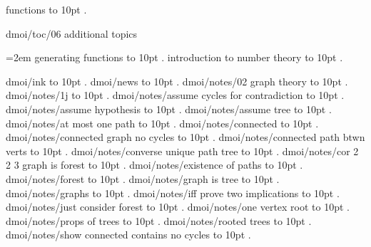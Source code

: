  functions \leaders\hbox to 10pt {\hss.\hss}  \hfill {}
\smallskip
\par\endgroup
\bigskip
{}
dmoi/toc/06 additional topics
\par\begingroup
\leftskip=2em
\smallskip
{} generating functions \leaders\hbox to 10pt {\hss.\hss}  \hfill {}
 introduction to number theory \leaders\hbox to 10pt {\hss.\hss}  \hfill {}
\smallskip
\par\endgroup
\bigskip
dmoi/ink \leaders\hbox to 10pt {\hss.\hss}  \hfill {}
\smallskip
dmoi/news \leaders\hbox to 10pt {\hss.\hss}  \hfill {}
\smallskip
dmoi/notes/02 graph theory \leaders\hbox to 10pt {\hss.\hss}  \hfill {}
\smallskip
dmoi/notes/1j \leaders\hbox to 10pt {\hss.\hss}  \hfill {}
\smallskip
dmoi/notes/assume cycles for contradiction \leaders\hbox to 10pt {\hss.\hss}  \hfill {}
\smallskip
dmoi/notes/assume hypothesis \leaders\hbox to 10pt {\hss.\hss}  \hfill {}
\smallskip
dmoi/notes/assume tree \leaders\hbox to 10pt {\hss.\hss}  \hfill {}
\smallskip
dmoi/notes/at most one path \leaders\hbox to 10pt {\hss.\hss}  \hfill {}
\smallskip
dmoi/notes/connected \leaders\hbox to 10pt {\hss.\hss}  \hfill {}
\smallskip
dmoi/notes/connected graph no cycles \leaders\hbox to 10pt {\hss.\hss}  \hfill {}
\smallskip
dmoi/notes/connected path btwn verts \leaders\hbox to 10pt {\hss.\hss}  \hfill {}
\smallskip
dmoi/notes/converse unique path tree \leaders\hbox to 10pt {\hss.\hss}  \hfill {}
\smallskip
dmoi/notes/cor 2 2 3 graph is forest \leaders\hbox to 10pt {\hss.\hss}  \hfill {}
\smallskip
dmoi/notes/existence of paths \leaders\hbox to 10pt {\hss.\hss}  \hfill {}
\smallskip
dmoi/notes/forest \leaders\hbox to 10pt {\hss.\hss}  \hfill {}
\smallskip
dmoi/notes/graph is tree \leaders\hbox to 10pt {\hss.\hss}  \hfill {}
\smallskip
dmoi/notes/graphs \leaders\hbox to 10pt {\hss.\hss}  \hfill {}
\smallskip
dmoi/notes/iff prove two implications \leaders\hbox to 10pt {\hss.\hss}  \hfill {}
\smallskip
dmoi/notes/just consider forest \leaders\hbox to 10pt {\hss.\hss}  \hfill {}
\smallskip
dmoi/notes/one vertex root \leaders\hbox to 10pt {\hss.\hss}  \hfill {}
\smallskip
dmoi/notes/props of trees \leaders\hbox to 10pt {\hss.\hss}  \hfill {}
\smallskip
dmoi/notes/rooted trees \leaders\hbox to 10pt {\hss.\hss}  \hfill {}
\smallskip
dmoi/notes/show connected contains no cycles \leaders\hbox to 10pt {\hss.\hss}  \hfill {}
